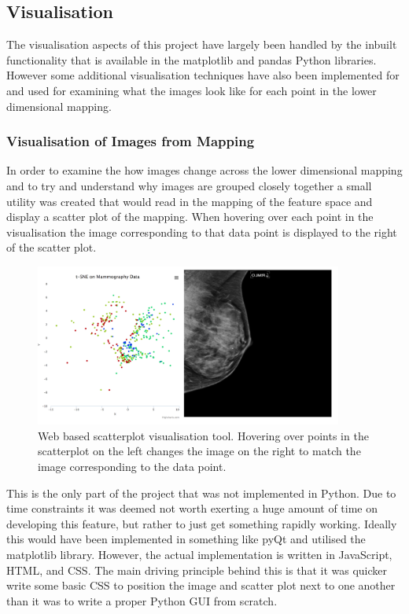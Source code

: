 \subsection{Visualisation}
The visualisation aspects of this project have largely been handled by the inbuilt functionality that is available in the matplotlib and pandas Python libraries. However some additional visualisation techniques have also been implemented for and used for examining what the images look like for each point in the lower dimensional mapping.

\subsubsection{Visualisation of Images from Mapping}
In order to examine the how images change across the lower dimensional mapping and to try and understand why images are grouped closely together a small utility was created that would read in the mapping of the feature space and display a scatter plot of the mapping. When hovering over each point in the visualisation the image corresponding to that data point is displayed to the right of the scatter plot.


\begin{figure}[H]
	\label{fig:nd-viz}
	\centering
	\includegraphics[width=0.9\textwidth]{Images/nd-viz.png}	
	\caption{Web based scatterplot visualisation tool. Hovering over points in the scatterplot on the left changes the image on the right to match the image corresponding to the data point.}
\end{figure}


This is the only part of the project that was not implemented in Python. Due to time constraints it was deemed not worth exerting a huge amount of time on developing this feature, but rather to just get something rapidly working. Ideally this would have been implemented in something like pyQt and utilised the matplotlib library. However, the actual implementation is written in JavaScript, HTML, and CSS. The main driving principle behind this is that it was quicker write some basic CSS to position the image and scatter plot next to one another than it was to write a proper Python GUI from scratch.

